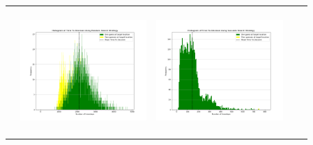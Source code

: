 \begin{landscape}
\begin{table}[h!]
\begin{tabular}{ | m{8mm} | c | c | c | c |}
\begin{minipage}[c][48mm][c]{48mm}
    \end{minipage}
    &
    \begin{minipage}[c][48mm][c]{48mm}
      \includegraphics[width=48mm, height=48mm]{Chapters/MultiAgentTargetDetection/Figs/Histograms/MiscalibratedSensor/4-4/4-4RandomHistogram.png}
    \end{minipage}
    &
    \begin{minipage}[c][48mm][c]{48mm}
      \includegraphics[width=48mm, height=48mm]{Chapters/MultiAgentTargetDetection/Figs/Histograms/MiscalibratedSensor/4-4/4-4SaccadicHistogram.png}
    \end{minipage}
    \\


\end{tabular}
\end{table}
\end{landscape}
